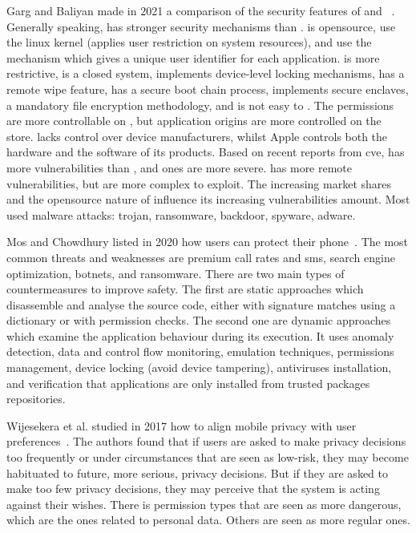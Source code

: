 Garg and Baliyan made in 2021 a comparison of the security features of  and ~\cite{garg_comparative_2021}. Generally speaking,  has stronger security mechanisms than .  is \gls{opensource}, use the \gls{linux} kernel (applies user restriction on system resources), and use the  mechanism which gives a unique user identifier for each application.  is more restrictive, is a closed system, implements device-level locking mechanisms, has a remote wipe feature, has a secure boot chain process, implements secure enclaves, a mandatory file encryption methodology, and is not easy to . The permissions are more controllable on , but application origins are more controlled on the  store.  lacks control over device manufacturers, whilst Apple controls both the hardware and the software of its products. Based on recent reports from \gls{cve},  has more vulnerabilities than , and  ones are more severe.  has more remote vulnerabilities, but are more complex to exploit. The increasing market shares and the \gls{opensource} nature of  influence its increasing vulnerabilities amount. Most used malware attacks: trojan, ransomware, \gls{backdoor}, spyware, adware. %

Mos and Chowdhury listed in 2020 how users can protect their  phone~\cite{mos_mobile_2020}. The most common threats and weaknesses are premium call rates and \gls{sms}, search engine optimization, botnets, and ransomware. There are two main types of countermeasures to improve safety. The first are static approaches which disassemble and analyse the source code, either with signature matches using a dictionary or with permission checks. The second one are dynamic approaches which examine the application behaviour during its execution. It uses anomaly detection, data and control flow monitoring, emulation techniques, permissions management, device locking (avoid device tampering), antiviruses installation, and verification that applications are only installed from trusted packages repositories. %

Wijesekera et al. studied in 2017 how to align mobile privacy with user preferences~\cite{wijesekera_feasibility_2017}. The authors found that if users are asked to make privacy decisions too frequently or under circumstances that are seen as low-risk, they may become habituated to future, more serious, privacy decisions. But if they are asked to make too few privacy decisions, they may perceive that the system is acting against their wishes. There is permission types that are seen as more dangerous, which are the ones related to personal data. Others are seen as more regular ones. %

